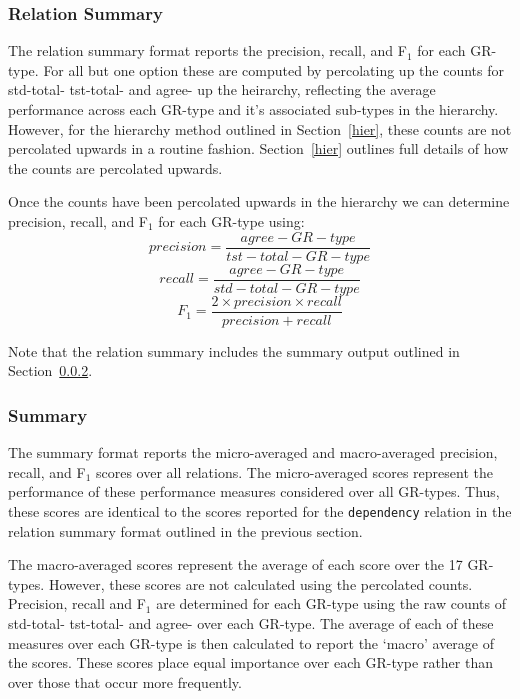 \documentclass[10pt]{article}
\newcommand{\stt}[1]{{\small\texttt{#1}}}
\begin{document}
\subsubsection{Relation Summary}
\label{relsum}

The relation summary format reports the precision, recall, and F$_{1}$ for 
each GR-type. For all but one option these are computed by percolating
up the counts for std-total- tst-total- and agree- up the heirarchy,
reflecting the average performance across each GR-type and it's
associated sub-types in the hierarchy. However, for the hierarchy method
outlined in Section~\ref{hier}, these counts are not percolated
upwards in a routine fashion. Section~\ref{hier} outlines full details
of how the counts are percolated upwards.

Once the counts have been percolated upwards in the hierarchy
we can determine precision, recall, and F$_{1}$ for each GR-type
using:
\begin{equation}
precision = \frac{agree-GR-type}{tst-total-GR-type}
\end{equation}
\begin{equation}
recall = \frac{agree-GR-type}{std-total-GR-type}
\end{equation}
\begin{equation}
F_{1} =  \frac{2 \times precision \times recall} {precision + recall}
\end{equation}

Note that the relation summary includes the summary output outlined
in Section~\ref{sum}.

\subsubsection{Summary}
\label{sum}

The summary format reports the micro-averaged and macro-averaged
precision, recall, and F$_{1}$ scores over all relations. 
The micro-averaged scores represent the performance of these 
performance measures considered over all GR-types. Thus, these
scores are identical to the scores reported for the
\stt{dependency} relation in the relation summary format outlined
in the previous section.

The macro-averaged scores represent the average of each score
over the 17 GR-types. 
However, these scores are not calculated using
the percolated counts. 
Precision, recall and F$_{1}$ are determined for each GR-type 
using the raw counts of std-total- tst-total- and agree- 
over each GR-type. The average of each of these measures over
each GR-type is then calculated to report the `macro' 
average of the scores.
These scores place equal importance over each GR-type rather
than over those that occur more frequently.
\end{document}
